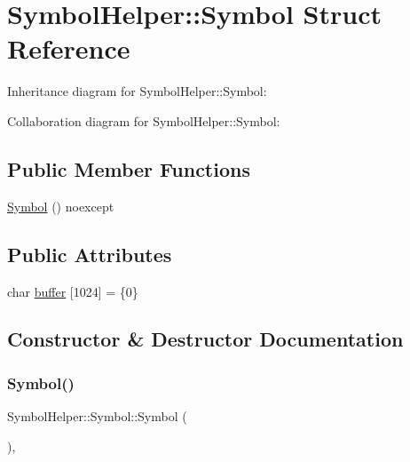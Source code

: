 \hypertarget{structSymbolHelper_1_1Symbol}{}\section{Symbol\+Helper\+:\+:Symbol Struct Reference}
\label{structSymbolHelper_1_1Symbol}


Inheritance diagram for Symbol\+Helper\+:\+:Symbol\+:


Collaboration diagram for Symbol\+Helper\+:\+:Symbol\+:
\subsection*{Public Member Functions}
\begin{DoxyCompactItemize}
\item 
\mbox{\hyperlink{structSymbolHelper_1_1Symbol_ac85aa8d3f9c031ce2d94987b608f0ad2}{Symbol}} () noexcept
\end{DoxyCompactItemize}
\subsection*{Public Attributes}
\begin{DoxyCompactItemize}
\item 
char \mbox{\hyperlink{structSymbolHelper_1_1Symbol_a6c4668d294f65cc22302b3fd93a7fffd}{buffer}} \mbox{[}1024\mbox{]} = \{0\}
\end{DoxyCompactItemize}


\subsection{Constructor \& Destructor Documentation}
\mbox{\label{structSymbolHelper_1_1Symbol_ac85aa8d3f9c031ce2d94987b608f0ad2}} 
\subsubsection{\texorpdfstring{Symbol()}{Symbol()}}
{\footnotesize\ttfamily Symbol\+Helper\+::\+Symbol\+::\+Symbol (\begin{DoxyParamCaption}{ }\end{DoxyParamCaption})\hspace{0.3cm}{\ttfamily [inline]}, {\ttfamily [noexcept]}}



